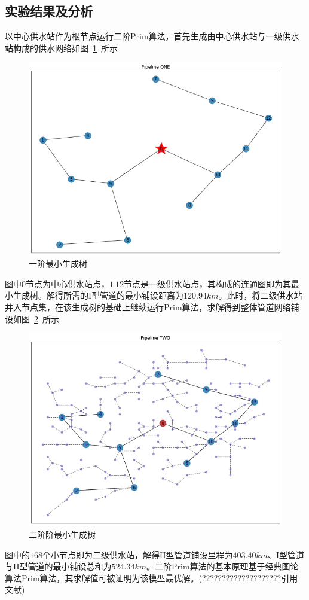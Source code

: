 \documentclass{whutmod}
\begin{document}
        \subsection{实验结果及分析}
       以中心供水站作为根节点运行二阶Prim算法，首先生成由中心供水站与一级供水站构成的供水网络如图~\ref{sdfb}~所示
       	\begin{figure}[H]
       	\centering
       	\includegraphics[width=\textwidth]{figures/444.png}
       	\caption{一阶最小生成树}\label{sdfb}
       \end{figure}
       图中$0$节点为中心供水站点，$1~12$节点是一级供水站点，其构成的连通图即为其最小生成树。解得所需的I型管道的最小铺设距离为$120.94km$。此时，将二级供水站并入节点集，在该生成树的基础上继续运行Prim算法，求解得到整体管道网络铺设如图~\ref{sgfhd}~所示
       	\begin{figure}[H]
       	\centering
       	\includegraphics[width=\textwidth]{figures/222.png}
       	\caption{二阶阶最小生成树}\label{sgfhd}
       \end{figure}
     图中的$168$个小节点即为二级供水站，解得II型管道铺设里程为$403.40km$、I型管道与II型管道的最小铺设总和为$524.34km$。二阶Prim算法的基本原理基于经典图论算法Prim算法，其求解值可被证明为该模型最优解。(????????????????????引用文献)
\end{document}
